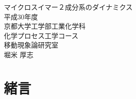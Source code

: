 \documentclass[11pt,a4j]{jarticle}
\begin{document}
\begin{titlepage}
\begin{center}
\vspace*{150truept}
{\huge マイクロスイマー２成分系のダイナミクス}\\ %
\vspace{10truept}
\vspace{180truept}
{\huge 平成30年度}\\
\vspace{20truept}
{\huge 京都大学工学部工業化学科}\\ 
{\huge 化学プロセス工学コース}\\ 
{\huge 移動現象論研究室}\\ 
\vspace{50truept}
{\huge 堀米 厚志}\\ %
\vspace{50truept}
\end{center}
\end{titlepage}
\thispagestyle{empty}
\tableofcontents
\clearpage
{}
\section{緒言}
\end{document}
